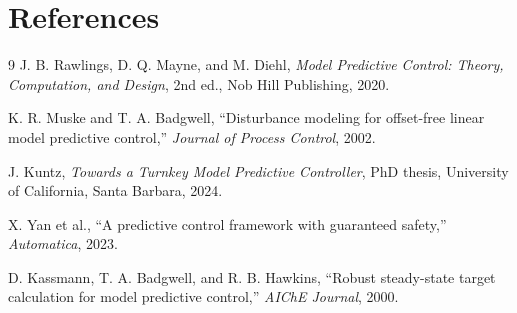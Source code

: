 \documentclass[11pt]{article}
\begin{document}
\section{References}
\begin{thebibliography}{9}
J. B. Rawlings, D. Q. Mayne, and M. Diehl,
\emph{Model Predictive Control: Theory, Computation, and Design},
2nd ed., Nob Hill Publishing, 2020.

K. R. Muske and T. A. Badgwell,
``Disturbance modeling for offset-free linear model predictive control,''
\emph{Journal of Process Control}, 2002.

J. Kuntz,
\emph{Towards a Turnkey Model Predictive Controller},
PhD thesis, University of California, Santa Barbara, 2024.

X. Yan et al.,
``A predictive control framework with guaranteed safety,''
\emph{Automatica}, 2023.

D. Kassmann, T. A. Badgwell, and R. B. Hawkins,
``Robust steady-state target calculation for model predictive control,''
\emph{AIChE Journal}, 2000.
\end{thebibliography}
\end{document}
